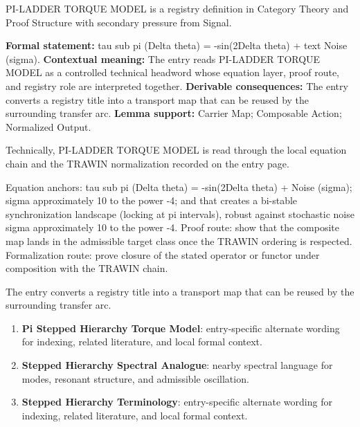 
\begingroup\small
{}
PI-LADDER TORQUE MODEL is a registry definition in Category Theory and Proof Structure with secondary pressure from Signal.

\begingroup\footnotesize\setlength{\emergencystretch}{3em}\sloppy
\textbf{Formal statement:} tau sub pi (Delta theta) = -sin(2Delta theta) + text Noise (sigma). \textbf{Contextual meaning:} The entry reads PI-LADDER TORQUE MODEL as a controlled technical headword whose equation layer, proof route, and registry role are interpreted together. \textbf{Derivable consequences:} The entry converts a registry title into a transport map that can be reused by the surrounding transfer arc. \textbf{Lemma support:} Carrier Map; Composable Action; Normalized Output.\par
\endgroup

Technically, PI-LADDER TORQUE MODEL is read through the local equation chain and the TRAWIN normalization recorded on the entry page.

Equation anchors: tau sub pi (Delta theta) = -sin(2Delta theta) + Noise (sigma); sigma approximately 10 to the power -4; and that creates a bi-stable synchronization landscape (locking at pi intervals), robust against stochastic noise sigma approximately 10 to the power -4. Proof route: show that the composite map lands in the admissible target class once the TRAWIN ordering is respected. Formalization route: prove closure of the stated operator or functor under composition with the TRAWIN chain.

The entry converts a registry title into a transport map that can be reused by the surrounding transfer arc.
\endgroup

\begin{enumerate}[leftmargin=1.6em,itemsep=6pt,topsep=4pt]
\item \textbf{Pi Stepped Hierarchy Torque Model}: entry-specific alternate wording for indexing, related literature, and local formal context.
\item \textbf{Stepped Hierarchy Spectral Analogue}: nearby spectral language for modes, resonant structure, and admissible oscillation.
\item \textbf{Stepped Hierarchy Terminology}: entry-specific alternate wording for indexing, related literature, and local formal context.
\end{enumerate}

